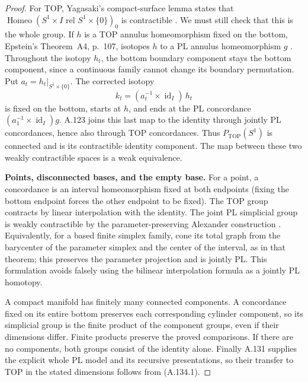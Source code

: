 \begin{proof}
For TOP, Yagasaki's compact-surface lemma states that
$\operatorname{Homeo}(S^1\times I\text{ rel }S^1\times\{0\})_0$
is contractible
\cite[Lemma~2.1(ii), p.~2, proof p.~3]{Yagasaki2000}.
We must still check that this is the whole group. If $h$ is a TOP
annulus homeomorphism fixed on the bottom, Epstein's Theorem~A4,
p.~107, isotopes $h$ to a PL annulus homeomorphism $g$
\cite{Epstein1966}. Throughout the isotopy $h_t$, the bottom boundary
component stays the bottom component, since a continuous family cannot
change its boundary permutation. Put $a_t=h_t|_{S^1\times\{0\}}$.
The corrected isotopy
\[
 k_t=(a_t^{-1}\times\operatorname{id}_I)\,h_t
                                                        \tag{A.134.6}
\]
is fixed on the bottom, starts at $h$, and ends at the PL concordance
$(a_1^{-1}\times\operatorname{id}_I)g$. A.123 joins this last map to
the identity through jointly PL concordances, hence also through TOP
concordances. Thus $P_{\mathrm{TOP}}(S^1)$ is connected and is its
contractible identity component. The map between these two weakly
contractible spaces is a weak equivalence.

\textbf{Points, disconnected bases, and the empty base.}
For a point, a concordance is an interval homeomorphism fixed at both
endpoints (fixing the bottom endpoint forces the other endpoint to be
fixed). The TOP group contracts by linear interpolation with the
identity. The joint PL simplicial group is weakly contractible by the
parameter-preserving Alexander construction
\cite[Theorem~2.2.1, p.~223]{Hamstrom1974}.
Equivalently, for a based finite simplex family, cone its total graph
from the barycenter of the parameter simplex and the center of the
interval, as in that theorem; this preserves the parameter projection
and is jointly PL. This formulation avoids falsely using the bilinear
interpolation formula as a jointly PL homotopy.

A compact manifold has finitely many connected components. A
concordance fixed on its entire bottom preserves each corresponding
cylinder component, so its simplicial group is the finite product of
the component groups, even if their dimensions differ. Finite products
preserve the proved comparisons. If there are no components, both
groups consist of the identity alone. Finally A.131 supplies the
explicit whole PL model and its recursive presentations, so their
transfer to TOP in the stated dimensions follows from (A.134.1).
\end{proof}
